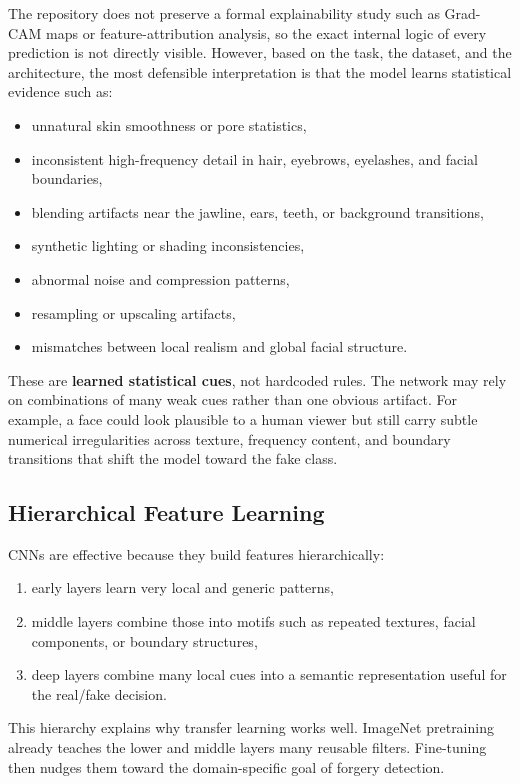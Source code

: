 \documentclass[11pt]{article}
\begin{document}
The repository does not preserve a formal explainability study such as Grad-CAM maps or feature-attribution analysis, so the exact internal logic of every prediction is not directly visible. However, based on the task, the dataset, and the architecture, the most defensible interpretation is that the model learns statistical evidence such as:
\begin{itemize}[leftmargin=1.5em]
    \item unnatural skin smoothness or pore statistics,
    \item inconsistent high-frequency detail in hair, eyebrows, eyelashes, and facial boundaries,
    \item blending artifacts near the jawline, ears, teeth, or background transitions,
    \item synthetic lighting or shading inconsistencies,
    \item abnormal noise and compression patterns,
    \item resampling or upscaling artifacts,
    \item mismatches between local realism and global facial structure.
\end{itemize}

These are \textbf{learned statistical cues}, not hardcoded rules. The network may rely on combinations of many weak cues rather than one obvious artifact. For example, a face could look plausible to a human viewer but still carry subtle numerical irregularities across texture, frequency content, and boundary transitions that shift the model toward the fake class.

\subsection{Hierarchical Feature Learning}

CNNs are effective because they build features hierarchically:
\begin{enumerate}[leftmargin=1.5em]
    \item early layers learn very local and generic patterns,
    \item middle layers combine those into motifs such as repeated textures, facial components, or boundary structures,
    \item deep layers combine many local cues into a semantic representation useful for the real/fake decision.
\end{enumerate}

This hierarchy explains why transfer learning works well. ImageNet pretraining already teaches the lower and middle layers many reusable filters. Fine-tuning then nudges them toward the domain-specific goal of forgery detection.
\end{document}
